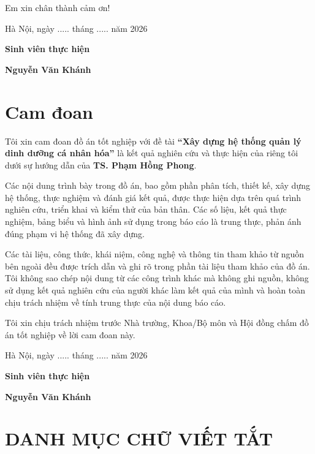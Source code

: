 \documentclass[12pt, a4paper]{report}
\begin{document}
Em xin chân thành cảm ơn!

Hà Nội, ngày ..... tháng ..... năm 2026

\textbf{Sinh viên thực hiện}

\textbf{Nguyễn Văn Khánh}


\chapter*{Cam đoan}
Tôi xin cam đoan đồ án tốt nghiệp với đề tài \textbf{“Xây dựng hệ thống quản lý dinh dưỡng cá nhân hóa”} là kết quả nghiên cứu và thực hiện của riêng tôi dưới sự hướng dẫn của \textbf{TS. Phạm Hồng Phong}.

Các nội dung trình bày trong đồ án, bao gồm phần phân tích, thiết kế, xây dựng hệ thống, thực nghiệm và đánh giá kết quả, được thực hiện dựa trên quá trình nghiên cứu, triển khai và kiểm thử của bản thân. Các số liệu, kết quả thực nghiệm, bảng biểu và hình ảnh sử dụng trong báo cáo là trung thực, phản ánh đúng phạm vi hệ thống đã xây dựng.

Các tài liệu, công thức, khái niệm, công nghệ và thông tin tham khảo từ nguồn bên ngoài đều được trích dẫn và ghi rõ trong phần tài liệu tham khảo của đồ án. Tôi không sao chép nội dung từ các công trình khác mà không ghi nguồn, không sử dụng kết quả nghiên cứu của người khác làm kết quả của mình và hoàn toàn chịu trách nhiệm về tính trung thực của nội dung báo cáo.

Tôi xin chịu trách nhiệm trước Nhà trường, Khoa/Bộ môn và Hội đồng chấm đồ án tốt nghiệp về lời cam đoan này.

Hà Nội, ngày ..... tháng ..... năm 2026

\textbf{Sinh viên thực hiện}

\textbf{Nguyễn Văn Khánh}

		
\clearpage
\renewcommand{\contentsname}{\centering MỤC LỤC}
\tableofcontents
\clearpage

\renewcommand{\listtablename}{\centering DANH MỤC BẢNG BIỂU}
\listoftables
\clearpage

\renewcommand{\listfigurename}{\centering DANH MỤC HÌNH ẢNH}
\listoffigures
\clearpage

\chapter*{DANH MỤC CHỮ VIẾT TẮT}
\end{document}
